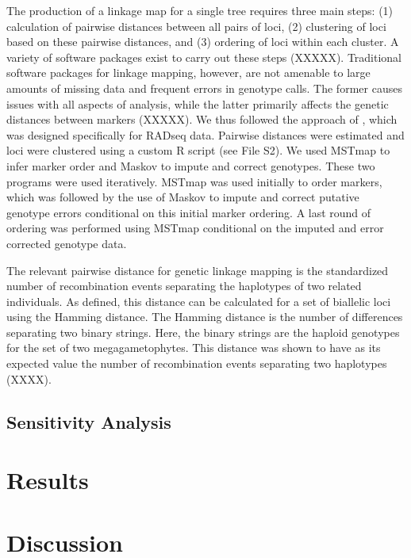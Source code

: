 \documentclass[11pt]{article}
\begin{document}
The production of a linkage map for a single tree requires three main steps: (1) calculation of 
pairwise distances between all pairs of loci, (2) clustering of loci based on these pairwise distances, 
and (3) ordering of loci within each cluster.  A variety of software packages exist to carry out these steps (XXXXX).
Traditional software packages for linkage mapping, however, are not amenable to large amounts of missing data and frequent
errors in genotype calls. The former causes issues with all aspects of analysis, while the latter primarily affects the 
genetic distances between markers (XXXXX). We thus followed the approach of \citet{Ward:2013}, which was designed specifically for RADseq
data. Pairwise distances were estimated and loci were clustered using a custom R script (see File S2). We used MSTmap \citep{Wu:2008} 
to infer marker order and Maskov \citep{Ward:2013} to impute and correct genotypes. These two programs
were used iteratively. MSTmap was used initially to order markers, which was followed by the use of Maskov
to impute and correct putative genotype errors conditional on this initial marker ordering. A last round of ordering 
was performed using MSTmap conditional on the imputed and error corrected genotype data. 

The relevant pairwise distance for genetic linkage mapping is the standardized number of recombination events separating
the haplotypes of two related individuals.  As defined, this distance can be calculated for a set of biallelic loci using the Hamming distance.
The Hamming distance is the number of differences separating two binary strings. Here, the binary strings are the haploid
genotypes for the set of two megagametophytes. This distance was shown to have as its expected value the number of recombination
events separating two haplotypes (XXXX).



\subsection*{Sensitivity Analysis}

\section*{Results}

\section*{Discussion}
\end{document}
